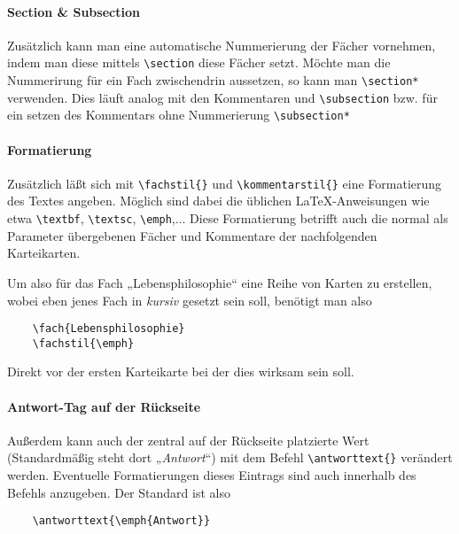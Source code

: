 \documentclass[a4paper]{article}
\begin{document}
\paragraph{Section \& Subsection} Zusätzlich kann man eine automatische Nummerierung der Fächer vornehmen, indem man diese mittels \lstinline!\section! diese Fächer setzt. Möchte man die Nummerirung für ein Fach zwischendrin aussetzen, so kann man \lstinline!\section*! verwenden. Dies läuft analog mit den Kommentaren und \lstinline!\subsection! bzw. für ein setzen des Kommentars ohne Nummerierung \lstinline!\subsection*!

\paragraph{Formatierung} Zusätzlich läßt sich mit \lstinline!\fachstil{}! und \lstinline!\kommentarstil{}! eine Formatierung des Textes angeben. Möglich sind dabei die üblichen \LaTeX-Anweisungen wie etwa \lstinline!\textbf!, \lstinline!\textsc!, \lstinline!\emph!,$\ldots$ Diese Formatierung betrifft auch die normal als Parameter übergebenen Fächer und Kommentare der nachfolgenden Karteikarten. 

Um also für das Fach „Lebensphilosophie“ eine Reihe von Karten zu erstellen, wobei eben jenes Fach in \emph{kursiv} gesetzt sein soll, benötigt man also
\begin{lstlisting}
	\fach{Lebensphilosophie}
	\fachstil{\emph}
\end{lstlisting}
Direkt vor der ersten Karteikarte bei der dies wirksam sein soll.

\paragraph{Antwort-Tag auf der Rückseite}\label{par:Antwort} Außerdem kann auch der zentral auf der Rückseite platzierte Wert (Standardmäßig steht dort „\emph{Antwort}“) mit dem Befehl \lstinline!\antworttext{}! verändert werden. Eventuelle Formatierungen dieses Eintrags sind auch innerhalb des Befehls anzugeben. Der Standard ist also
\begin{lstlisting}
	\antworttext{\emph{Antwort}}
\end{lstlisting}
\end{document}
